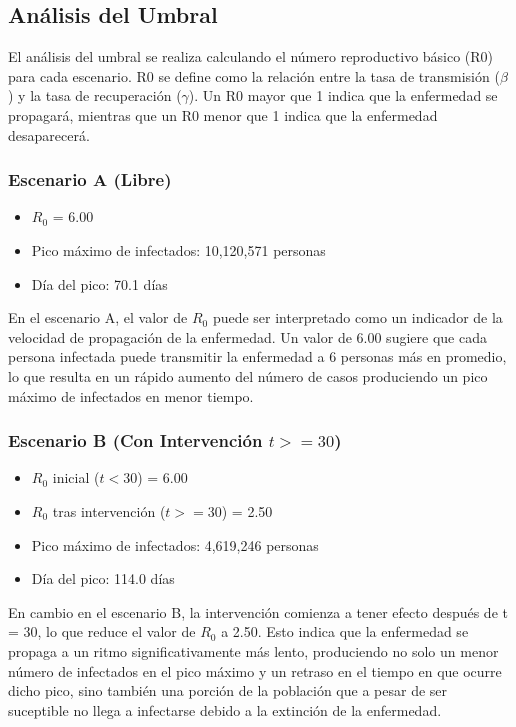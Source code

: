 \documentclass[12pt]{article}
\begin{document}
        \subsection{Análisis del Umbral}
        El análisis del umbral se realiza calculando el número reproductivo básico (R0) para cada escenario. R0 se define como la relación entre la tasa de transmisión ($\beta$) y la tasa de recuperación ($\gamma$). Un R0 mayor que 1 indica que la enfermedad se propagará, mientras que un R0 menor que 1 indica que la enfermedad desaparecerá.

        \subsubsection*{Escenario A (Libre)}
        \begin{itemize}
            \item $R_0$ = 6.00
            \item Pico máximo de infectados: 10,120,571 personas
            \item Día del pico: 70.1 días
        \end{itemize}

        En el escenario A, el valor de $R_0$ puede ser interpretado como un indicador de la velocidad de propagación de la enfermedad. Un valor de 6.00 sugiere que cada persona infectada puede transmitir la enfermedad a 6 personas más en promedio, lo que resulta en un rápido aumento del número de casos produciendo un pico máximo de infectados en menor tiempo.

        \subsubsection*{Escenario B (Con Intervención $t >= 30$)}
        \begin{itemize}
            \item $R_0$ inicial ($t < 30$) = 6.00
            \item $R_0$ tras intervención ($t >= 30$) = 2.50
            \item Pico máximo de infectados: 4,619,246 personas
            \item Día del pico: 114.0 días
        \end{itemize}

        En cambio en el escenario B, la intervención comienza a tener efecto después de t = 30, lo que reduce el valor de $R_0$ a 2.50. Esto indica que la enfermedad se propaga a un ritmo significativamente más lento, produciendo no solo un menor número de infectados en el pico máximo y un retraso en el tiempo en que ocurre dicho pico, sino también una porción de la población que a pesar de ser suceptible no llega a infectarse debido a la extinción de la enfermedad.
\end{document}
